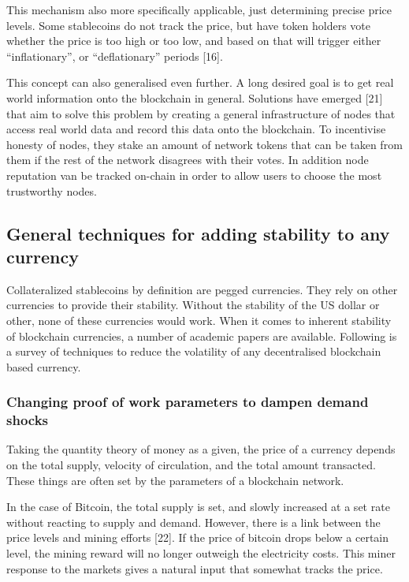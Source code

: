 \documentclass[english,]{IEEEtran}
\begin{document}
This mechanism also more specifically applicable, just determining
precise price levels. Some stablecoins do not track the price, but have
token holders vote whether the price is too high or too low, and based
on that will trigger either ``inflationary'', or ``deflationary''
periods {[}16{]}.

This concept can also generalised even further. A long desired goal is
to get real world information onto the blockchain in general. Solutions
have emerged {[}21{]} that aim to solve this problem by creating a
general infrastructure of nodes that access real world data and record
this data onto the blockchain. To incentivise honesty of nodes, they
stake an amount of network tokens that can be taken from them if the
rest of the network disagrees with their votes. In addition node
reputation van be tracked on-chain in order to allow users to choose the
most trustworthy nodes.

\subsection{General techniques for adding stability to any
currency}\label{general-techniques-for-adding-stability-to-any-currency}

Collateralized stablecoins by definition are pegged currencies. They
rely on other currencies to provide their stability. Without the
stability of the US dollar or other, none of these currencies would
work. When it comes to inherent stability of blockchain currencies, a
number of academic papers are available. Following is a survey of
techniques to reduce the volatility of any decentralised blockchain
based currency.

\subsubsection{Changing proof of work parameters to dampen demand
shocks}\label{changing-proof-of-work-parameters-to-dampen-demand-shocks}

Taking the quantity theory of money as a given, the price of a currency
depends on the total supply, velocity of circulation, and the total
amount transacted. These things are often set by the parameters of a
blockchain network.

In the case of Bitcoin, the total supply is set, and slowly increased at
a set rate without reacting to supply and demand. However, there is a
link between the price levels and mining efforts {[}22{]}. If the price
of bitcoin drops below a certain level, the mining reward will no longer
outweigh the electricity costs. This miner response to the markets gives
a natural input that somewhat tracks the price.
\end{document}
